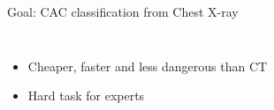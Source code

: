 \documentclass[compress,aspectratio=169,xcolor=table]{beamer}
\begin{document}
\begin{frame}{Goal: CAC classification from Chest X-ray}
	\begin{columns}[onlytextwidth]
			\begin{itemize}
				\item Cheaper, faster and less dangerous than CT
				\item Hard task for experts
			\end{itemize}
		\begin{figure}
			\centering
			\begin{subfigure}[b]{0.4\textwidth}
			\end{subfigure}\hspace{0.5em}
			\begin{subfigure}[b]{0.4\textwidth}
			\end{subfigure}\hspace{0.5em}
		\end{figure}
	\end{columns}


\end{frame}
\end{document}

